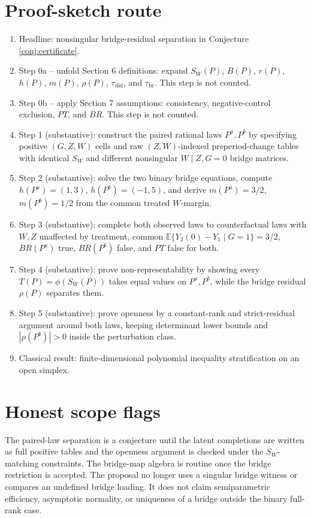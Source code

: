 \documentclass[11pt]{article}
\newcommand{\E}{\mathbb{E}}
\theoremstyle{definition}
\theoremstyle{plain}
\theoremstyle{remark}
\begin{document}
\section{Proof-sketch route}
\begin{enumerate}[leftmargin=*]
\item Headline: nonsingular bridge-residual separation in Conjecture \ref{conj:certificate}.
\item Step 0a -- unfold Section 6 definitions: expand \(S_W(P)\), \(B(P)\), \(r(P)\), \(h(P)\), \(m(P)\), \(\rho(P)\), \(\tau_{\mathrm{did}}\), and \(\tau_{\mathrm{br}}\). This step is not counted.
\item Step 0b -- apply Section 7 assumptions: consistency, negative-control exclusion, \(PT\), and \(BR\). This step is not counted.
\item Step 1 (substantive): construct the paired rational laws \(P^a,P^b\) by specifying positive \((G,Z,W)\) cells and raw \((Z,W)\)-indexed preperiod-change tables with identical \(S_W\) and different nonsingular \(W\mid Z,G=0\) bridge matrices.
\item Step 2 (substantive): solve the two binary bridge equations, compute \(h(P^a)=(1,3)\), \(h(P^b)=(-1,5)\), and derive \(m(P^a)=3/2\), \(m(P^b)=1/2\) from the common treated \(W\)-margin.
\item Step 3 (substantive): complete both observed laws to counterfactual laws with \(W,Z\) unaffected by treatment, common \(\E\{Y_2(0)-Y_1\mid G=1\}=3/2\), \(BR(P^a)\) true, \(BR(P^b)\) false, and \(PT\) false for both.
\item Step 4 (substantive): prove non-representability by showing every \(T(P)=\phi(S_W(P))\) takes equal values on \(P^a,P^b\), while the bridge residual \(\rho(P)\) separates them.
\item Step 5 (substantive): prove openness by a constant-rank and strict-residual argument around both laws, keeping determinant lower bounds and \(|\rho(P^b)|>0\) inside the perturbation class.
\item Classical result: finite-dimensional polynomial inequality stratification on an open simplex.
\end{enumerate}

\section{Honest scope flags}
The paired-law separation is a conjecture until the latent completions are written as full positive tables and the openness argument is checked under the \(S_W\)-matching constraints. The bridge-map algebra is routine once the bridge restriction is accepted. The proposal no longer uses a singular bridge witness or compares an undefined bridge loading. It does not claim semiparametric efficiency, asymptotic normality, or uniqueness of a bridge outside the binary full-rank case.
\end{document}
